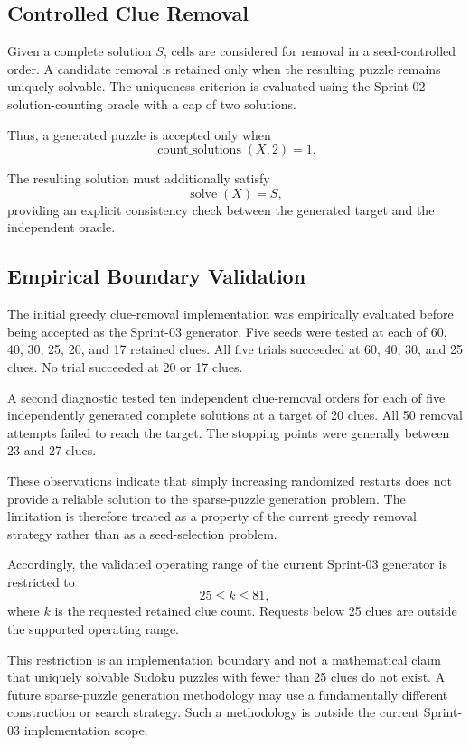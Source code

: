 \documentclass[11pt,a4paper]{article}
\begin{document}
\subsection{Controlled Clue Removal}

Given a complete solution \(S\), cells are considered for removal in a
seed-controlled order. A candidate removal is retained only when the
resulting puzzle remains uniquely solvable. The uniqueness criterion is
evaluated using the Sprint-02 solution-counting oracle with a cap of two
solutions.

Thus, a generated puzzle is accepted only when
\[
\operatorname{count\_solutions}(X,2)=1.
\]

The resulting solution must additionally satisfy
\[
\operatorname{solve}(X)=S,
\]
providing an explicit consistency check between the generated target and
the independent oracle.


\subsection{Empirical Boundary Validation}

The initial greedy clue-removal implementation was empirically evaluated
before being accepted as the Sprint-03 generator. Five seeds were tested at
each of 60, 40, 30, 25, 20, and 17 retained clues. All five trials succeeded
at 60, 40, 30, and 25 clues. No trial succeeded at 20 or 17 clues.

A second diagnostic tested ten independent clue-removal orders for each of
five independently generated complete solutions at a target of 20 clues.
All 50 removal attempts failed to reach the target. The stopping points were
generally between 23 and 27 clues.

These observations indicate that simply increasing randomized restarts does
not provide a reliable solution to the sparse-puzzle generation problem.
The limitation is therefore treated as a property of the current greedy
removal strategy rather than as a seed-selection problem.

Accordingly, the validated operating range of the current Sprint-03
generator is restricted to
\[
25\leq k\leq81,
\]
where \(k\) is the requested retained clue count. Requests below 25 clues
are outside the supported operating range.

This restriction is an implementation boundary and not a mathematical claim
that uniquely solvable Sudoku puzzles with fewer than 25 clues do not exist.
A future sparse-puzzle generation methodology may use a fundamentally
different construction or search strategy. Such a methodology is outside
the current Sprint-03 implementation scope.
\end{document}
